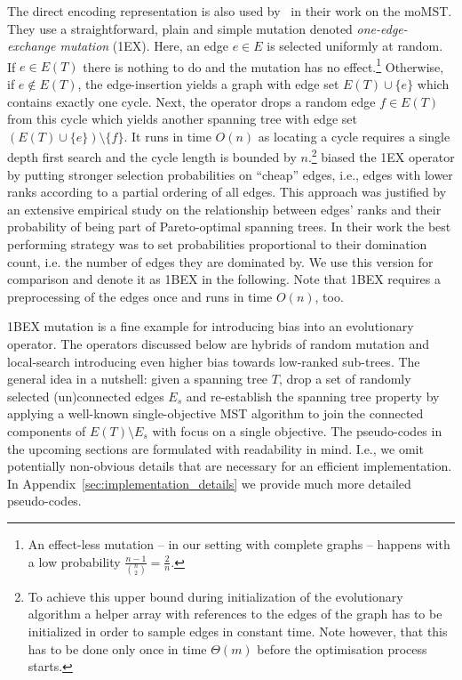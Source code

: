 \documentclass[twoside]{article}
\begin{document}
The direct encoding representation is also used by~\citet{KC01} in their work on the moMST. They use a straightforward, plain and simple mutation denoted \emph{one-edge-exchange mutation} (1EX). Here, an edge $e \in E$ is selected uniformly at random. If $e \in E(T)$ there is nothing to do and the mutation has no effect.\footnote{An effect-less mutation -- in our setting with complete graphs -- happens with a low probability $\frac{n-1}{\binom{n}{2}} = \frac{2}{n}$.} Otherwise, if $e \notin E(T)$, the edge-insertion yields a graph with edge set $E(T) \cup \{e\}$ which contains exactly one cycle. Next, the operator drops a random edge $f \in E(T)$ from this cycle which yields another spanning tree with edge set $(E(T) \cup \{e\}) \setminus \{f\}$. It runs in time $O(n)$ as locating a cycle requires a single depth first search and the cycle length is bounded by $n$.\footnote{To achieve this upper bound during initialization of the evolutionary algorithm a helper array with references to the edges of the graph has to be initialized in order to sample edges in constant time. Note however, that this has to be done only once in time $\Theta(m)$ before the optimisation process starts.}
\citet{BNG2019} biased the 1EX operator by putting stronger selection probabilities on \enquote{cheap} edges, i.e., edges with lower ranks according to a partial ordering of all edges. This approach was justified by an extensive empirical study on the relationship between edges' ranks and their probability of being part of Pareto-optimal spanning trees. In their work the best performing strategy was to set probabilities proportional to their domination count, i.e. the number of edges they are dominated by. We use this version for comparison and denote it as 1BEX in the following. Note that 1BEX requires a preprocessing of the edges once and runs in time $O(n)$, too.

1BEX mutation is a fine example for introducing bias into an evolutionary operator. The operators discussed below are hybrids of random mutation and local-search introducing even higher bias towards low-ranked sub-trees. The general idea in a nutshell: given a spanning tree $T$, drop a set of randomly selected (un)connected edges $E_s$ and re-establish the spanning tree property by applying a well-known single-objective MST algorithm to join the connected components of $E(T)\setminus E_s$ with focus on a single objective.
The pseudo-codes in the upcoming sections are formulated with readability in mind. I.e., we omit potentially non-obvious details that are necessary for an efficient implementation. In Appendix~\ref{sec:implementation_details} we provide much more detailed pseudo-codes.
\end{document}
